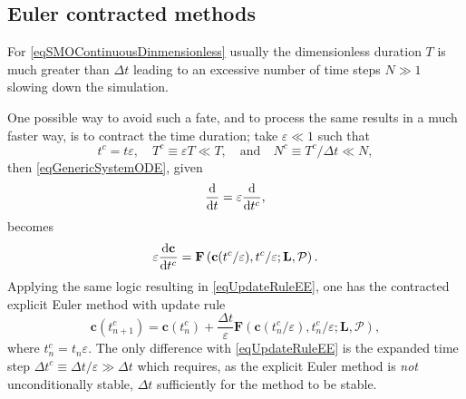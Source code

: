             \subsection{Euler contracted methods}\label{apxEulerContractedMethods}

                For \eqref{eqSMOContinuousDinmensionless} usually the dimensionless duration $T$ is much greater than $\Delta t$ leading to an excessive number of time steps $N\gg1$ slowing down the simulation.
                
                One possible way to avoid such a fate, and to process the same results in a much faster way, is to contract the time duration; take $\varepsilon\ll1$ such that 
                \begin{equation*}
                    t^c=t\varepsilon,\quad
                    T^c\equiv\varepsilon T\ll T,
                    \quad\text{and}\quad
                    N^c\equiv T^c/\Delta t\ll N,
                \end{equation*}
                then \eqref{eqGenericSystemODE}, given
                \begin{equation*}
                    \frac{\mathrm{d}}{\mathrm{d}t}=\varepsilon\frac{\mathrm{d}}{\mathrm{d}t^c},
                \end{equation*}
                becomes
                \begin{equation}
                    \varepsilon\frac{\mathrm{d}\mathbf c}{\mathrm{d}t^c}=
                    \mathbf F\left(\mathbf c(t^c/\varepsilon),
                    t^c/\varepsilon;\mathbf L,\mathcal P\right).
                    \label{eqGenericSystemODEContracted}
                \end{equation}
                Applying the same logic resulting in \eqref{eqUpdateRuleEE}, one has the contracted explicit Euler method with update rule
                \begin{equation}
                    \mathbf c(t^c_{n+1})=\mathbf c(t^c_n)
                    +\frac{\Delta t}\varepsilon
                    \mathbf F\left(\mathbf c(t^c_n/\varepsilon),
                    t^c_n/\varepsilon;\mathbf L,\mathcal P\right),
                    \label{eqUpdateRuleEEContracted}
                \end{equation}
                where $t^c_n=t_n\varepsilon$. The only difference with \eqref{eqUpdateRuleEE} is the expanded time step $\Delta t^c\equiv\Delta t/\varepsilon\gg\Delta t$ which requires, as the explicit Euler method is \textit{not} unconditionally stable, $\Delta t$ sufficiently for the method to be stable.

